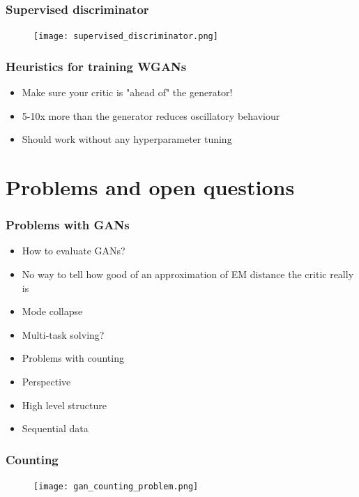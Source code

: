 \documentclass{Bredelebeamer}
\begin{document}
\begin{frame}
	\frametitle{Supervised discriminator}
	\begin{figure}[h!]
	\centering
	\texttt{[image: supervised\_discriminator.png]}
	\end{figure}
\end{frame}
\begin{frame}
\frametitle{Heuristics for training WGANs}
\begin{itemize}
	\item Make sure your critic is "ahead of" the generator!
	\item 5-10x more than the generator reduces oscillatory behaviour
	\item Should work without any hyperparameter tuning
\end{itemize}
\end{frame}


\section{Problems and open questions}
\begin{frame}
	\frametitle{Problems with GANs}
	\begin{itemize}[<+->]
		\item How to evaluate GANs?
		\item No way to tell how good of an approximation of EM distance the critic really is
		\item Mode collapse
		\item Multi-task solving?
		\item Problems with counting
		\item Perspective
		\item High level structure
		\item Sequential data
	\end{itemize}
\end{frame}

\begin{frame} \frametitle{Counting}
	\begin{figure}[h!]
	\centering
	\texttt{[image: gan\_counting\_problem.png]}
	\end{figure}
\end{frame}
\end{document}
